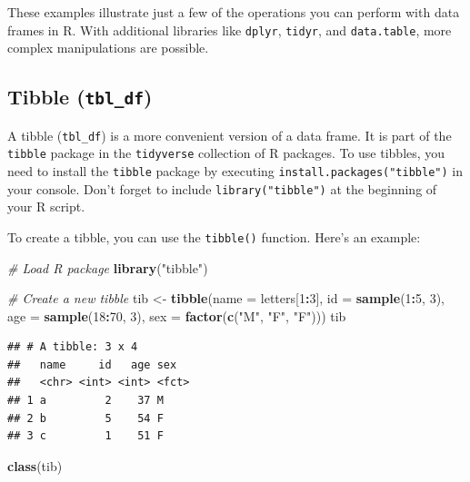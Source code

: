 \documentclass[
]{book}
\newenvironment{Shaded}{\begin{snugshade}}{\end{snugshade}}
\newcommand{\AttributeTok}[1]{\textcolor[rgb]{0.13,0.29,0.53}{#1}}
\newcommand{\CommentTok}[1]{\textcolor[rgb]{0.56,0.35,0.01}{\textit{#1}}}
\newcommand{\DecValTok}[1]{\textcolor[rgb]{0.00,0.00,0.81}{#1}}
\newcommand{\FunctionTok}[1]{\textcolor[rgb]{0.13,0.29,0.53}{\textbf{#1}}}
\newcommand{\NormalTok}[1]{#1}
\newcommand{\OtherTok}[1]{\textcolor[rgb]{0.56,0.35,0.01}{#1}}
\newcommand{\SpecialCharTok}[1]{\textcolor[rgb]{0.81,0.36,0.00}{\textbf{#1}}}
\newcommand{\StringTok}[1]{\textcolor[rgb]{0.31,0.60,0.02}{#1}}
\begin{document}
These examples illustrate just a few of the operations you can perform with data frames in R. With additional libraries like \texttt{dplyr}, \texttt{tidyr}, and \texttt{data.table}, more complex manipulations are possible.

\hypertarget{tibble}{%
\subsection{\texorpdfstring{Tibble (\texttt{tbl\_df})}{Tibble (tbl\_df)}}\label{tibble}}

A tibble (\texttt{tbl\_df}) is a more convenient version of a data frame. It is part of the \texttt{tibble} package in the \texttt{tidyverse} collection of R packages. To use tibbles, you need to install the \texttt{tibble} package by executing \texttt{install.packages("tibble")} in your console. Don't forget to include \texttt{library("tibble")} at the beginning of your R script.

To create a tibble, you can use the \texttt{tibble()} function. Here's an example:

\begin{Shaded}
\begin{Highlighting}[]
\CommentTok{\# Load R package}
\FunctionTok{library}\NormalTok{(}\StringTok{"tibble"}\NormalTok{)}

\CommentTok{\# Create a new tibble}
\NormalTok{tib }\OtherTok{\textless{}{-}} \FunctionTok{tibble}\NormalTok{(}\AttributeTok{name =}\NormalTok{ letters[}\DecValTok{1}\SpecialCharTok{:}\DecValTok{3}\NormalTok{], }
              \AttributeTok{id =} \FunctionTok{sample}\NormalTok{(}\DecValTok{1}\SpecialCharTok{:}\DecValTok{5}\NormalTok{, }\DecValTok{3}\NormalTok{),}
              \AttributeTok{age =} \FunctionTok{sample}\NormalTok{(}\DecValTok{18}\SpecialCharTok{:}\DecValTok{70}\NormalTok{, }\DecValTok{3}\NormalTok{),}
              \AttributeTok{sex =} \FunctionTok{factor}\NormalTok{(}\FunctionTok{c}\NormalTok{(}\StringTok{"M"}\NormalTok{, }\StringTok{"F"}\NormalTok{, }\StringTok{"F"}\NormalTok{)))}
\NormalTok{tib}
\end{Highlighting}
\end{Shaded}

\begin{verbatim}
## # A tibble: 3 x 4
##   name     id   age sex  
##   <chr> <int> <int> <fct>
## 1 a         2    37 M    
## 2 b         5    54 F    
## 3 c         1    51 F
\end{verbatim}

\begin{Shaded}
\begin{Highlighting}[]
\FunctionTok{class}\NormalTok{(tib)}
\end{Highlighting}
\end{Shaded}
\end{document}
